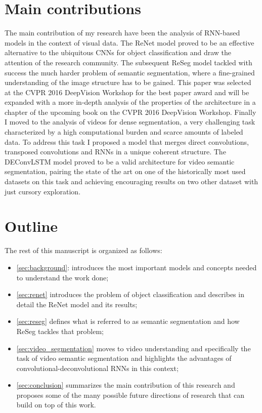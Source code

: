 \section{Main contributions}
The main contribution of my research have been the analysis of RNN-based
models in the context of visual data. The ReNet model proved to be an effective
alternative to the ubiquitous CNNs for object classification and draw the
attention of the research community. The subsequent ReSeg model tackled with
success the much harder problem of semantic segmentation, where a fine-grained
understanding of the image structure has to be gained. This paper was selected
at the CVPR 2016 DeepVision Workshop for the best paper award and will be
expanded with a more in-depth analysis of the properties of the architecture in
a chapter of the upcoming book on the CVPR 2016 DeepVision Workshop. Finally I
moved to the analysis of videos for dense segmentation, a very challenging task
characterized by a high computational burden and scarce amounts of labeled
data. To address this task I proposed a model that merges direct convolutions,
transposed convolutions and RNNs in a unique coherent structure. The DEConvLSTM
model proved to be a valid architecture for video semantic segmentation,
pairing the state of the art on one of the historically most used datasets on
this task and achieving encouraging results on two other dataset with just
cursory exploration.


\section{Outline}
The rest of this manuscript is organized as follows:

\begin{itemize}
    \item \autoref{sec:background}: introduces the most important models and
        concepts needed to understand the work done;
    \item \autoref{sec:renet} introduces the problem of object classification
        and describes in detail the ReNet model and its results;
    \item \autoref{sec:reseg} defines what is referred to as semantic
        segmentation and how ReSeg tackles that problem;
    \item \autoref{sec:video_segmentation} moves to video understanding and
        specifically the task of video semantic segmentation and highlights the
        advantages of convolutional-deconvolutional RNNs in this context;
    \item \autoref{sec:conclusion} summarizes the main contribution of this
        research and proposes some of the many possible future directions of
        research that can build on top of this work.
\end{itemize}
